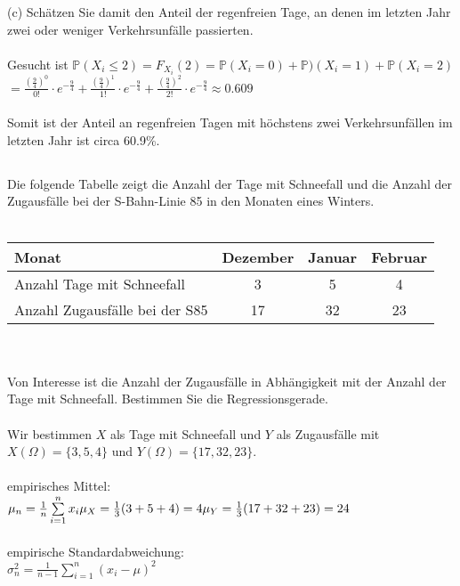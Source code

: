 \documentclass[a4paper]{article}
\begin{document}
(c) Schätzen Sie damit den Anteil der regenfreien Tage, an denen im letzten Jahr zwei oder weniger Verkehrsunfälle passierten.\\\\
Gesucht ist $\mathbb{P}(X_i \leq 2) = F_{X_i}(2) = \mathbb{P}(X_i = 0) + \mathbb{P})(X_i = 1) + \mathbb{P}(X_i = 2)$\\
$= \frac{\left( \frac{9}{4} \right)^0}{0!} \cdot e^{- \frac{9}{4}} + \frac{\left( \frac{9}{4} \right)^1}{1!} \cdot e^{- \frac{9}{4}} + \frac{\left( \frac{9}{4} \right)^2}{2!} \cdot e^{- \frac{9}{4}} \approx 0.609$\\\\
Somit ist der Anteil an regenfreien Tagen mit höchstens zwei Verkehrsunfällen im letzten Jahr ist circa 60.9\%. 

\subsection{}
Die folgende Tabelle zeigt die Anzahl der Tage mit Schneefall und die Anzahl der Zugausfälle bei der S-Bahn-Linie 85 in den Monaten eines Winters.\\\\
\begin{tabular}{l|c|c|c}
    Monat & Dezember & Januar & Februar \\
    \hline
    Anzahl Tage mit Schneefall & 3 & 5 & 4 \\
    \hline
    Anzahl Zugausfälle bei der S85 & 17 & 32 & 23\\
\end{tabular}\\\\
Von Interesse ist die Anzahl der Zugausfälle in Abhängigkeit mit der Anzahl der Tage mit Schneefall. Bestimmen Sie die Regressionsgerade.\\\\
Wir bestimmen $X$ als Tage mit Schneefall und $Y$ als Zugausfälle mit $X(\Omega)=\{3,5,4\}$ und $Y(\Omega)=\{17, 32, 23\}$.\\\\
empirisches Mittel:\\
\(\mu_n = \frac{1}{n} \sum\limits^n_{i=1} x_i\\
\mu_X=\frac{1}{3}(3+5+4)=4\\
\mu_Y=\frac{1}{3}(17+32+23)=24\)\\\\
empirische Standardabweichung:\\
\(\sigma^2_n= \frac{1}{n-1}\sum\limits^n_{i=1}(x_i-\mu)^2\)\\
\end{document}
